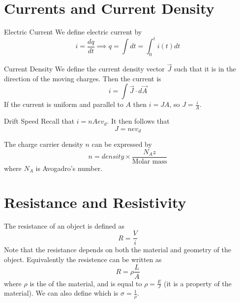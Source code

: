 \documentclass[12pt]{report}
\begin{document}
\section{Currents and Current Density}

\begin{defn}{Electric Current}{}
        We define electric current by \begin{equation}
                i = \frac{dq}{dt} \implies q = \int dt = \int_0^ti(t)dt
        \end{equation}
\end{defn}


\begin{defn}{Current Density}{}
        We define the current density vector $\vec{J}$ such that it is in the direction of the moving charges. Then the current is \begin{equation}
                i = \int\vec{J} \cdot d\vec{A}
        \end{equation}
        If the current is uniform and parallel to $A$ then $i = JA$, so $J  =\frac{i}{A}$.
\end{defn}

\begin{cor}{Drift Speed}{}
        Recall that $i = nAev_d$. It then follows that \begin{equation}
                J = nev_d
        \end{equation}
\end{cor}


\begin{rmk}{}{}
        The charge carrier density $n$ can be expressed by \begin{equation}
                n = density\times \frac{N_Az}{\text{Molar mass}}
        \end{equation}
        where $N_A$ is Avogadro's number.
\end{rmk}


\section{Resistance and Resistivity}


\begin{defn}{}{}
        The resistance of an object is defined as \begin{equation}
                R = \frac{V}{i}
        \end{equation}
        Note that the resistance depends on both the material and geometry of the object. Equivalently the resistence can be written as \begin{equation}
                R = \rho \frac{L}{A}
        \end{equation}
        where $\rho$ is the  of the material, and is equal to $\rho = \frac{E}{J}$ (it is a property of the material). We can also define  which is $\sigma = \frac{1}{\rho}$.
\end{defn}
\end{document}
